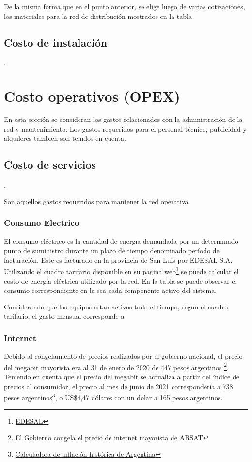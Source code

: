 \documentclass[11pt,a4paper]{article}
\begin{document}
De la misma forma que en el punto anterior, se elige luego de varias cotizaciones, los materiales para la red de distribución mostrados en la tabla 

\subsection{Costo de instalación}.



\section{Costo operativos (OPEX)}

En esta sección se consideran los gastos relacionados con la administración de la red y mantenimiento. Los gastos requeridos para el personal técnico, publicidad y alquileres también son tenidos en cuenta. 

\subsection{Costo de servicios}.

Son aquellos gastos requeridos para mantener la red operativa.

\subsubsection{Consumo Electrico}

El consumo eléctrico es la cantidad de energía demandada por un determinado punto de suministro durante un plazo de tiempo denominado período de facturación. Este es facturado en la provincia de San Luis por EDESAL S.A. Utilizando el cuadro tarifario disponible en su pagina web\footnote{\href{https://oficinavirtualedesal.com.ar/ove/html/simulacion.html}{EDESAL}} se puede calcular el costo de energía eléctrica utilizado por la red.
En la tabla se puede observar el consumo correspondiente en la sea cada componente activo del sistema.

Considerando que los equipos estan activos todo el tiempo, segun el cuadro tarifario, el gasto mensual corresponde a 

\subsubsection{Internet}

Debido al congelamiento de precios realizados por el gobierno nacional, el precio del megabit mayorista era al 31 de enero de 2020 de 447 pesos argentinos
\footnote{\href{https://www.argentina.gob.ar/noticias/el-gobierno-congela-el-precio-de-internet-mayorista-de-arsat\#:~:text=El\%20vicejefe\%20de\%20Gabinete\%20y,de\%20$447\%20pesos\%20por\%20mega.}{El Gobierno congela el precio de internet mayorista de ARSAT}}.
Teniendo en cuenta que el precio del megabit se actualiza a partir del índice de precios al consumidor, el precio al mes de junio de 2021 correspondería a 738 pesos argentinos\footnote{\href{https://calculadoradeinflacion.com/argentina.html?md=enero&ad=2020&mh=junio&ah=2021&q=447}{Calculadora de inflación
histórica de Argentina}}, o US\$4,47 dólares con un dolar a 165 pesos argentinos.
\end{document}
